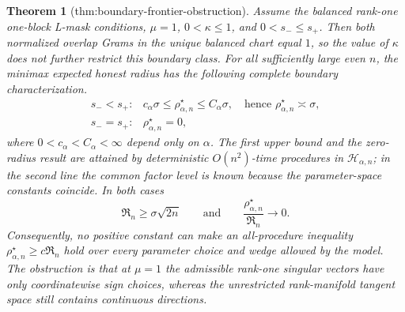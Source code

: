 \documentclass{article}
\newtheorem{theorem}{Theorem}
\begin{document}
\begin{theorem}[thm:boundary-frontier-obstruction]\label{thm:boundary-frontier-obstruction}
Assume the balanced rank-one one-block L-mask conditions, \(\mu=1\), \(0<\kappa\le 1\), and \(0<s_-\le s_+\).  Then both normalized overlap Grams in the unique balanced chart equal \(1\), so the value of \(\kappa\) does not further restrict this boundary class.  For all sufficiently large even \(n\), the minimax expected honest radius has the following complete boundary characterization.
\[
\begin{array}{ll}
s_-<s_+:& c_\alpha\sigma\le \rho_{\alpha,n}^{\star}\le C_\alpha\sigma,
\quad\text{hence }\rho_{\alpha,n}^{\star}\asymp\sigma,\\[3pt]
s_-=s_+:& \rho_{\alpha,n}^{\star}=0,
\end{array}
\]
where \(0<c_\alpha<C_\alpha<\infty\) depend only on \(\alpha\).  The first upper bound and the zero-radius result are attained by deterministic \(O(n^2)\)-time procedures in \(\mathcal H_{\alpha,n}\); in the second line the common factor level is known because the parameter-space constants coincide.  In both cases
\[
\mathfrak R_n\ge \sigma\sqrt{2n}
\qquad\text{and}\qquad
\frac{\rho_{\alpha,n}^{\star}}{\mathfrak R_n}\longrightarrow0.
\]
Consequently, no positive constant can make an all-procedure inequality \(\rho_{\alpha,n}^{\star}\ge c\mathfrak R_n\) hold over every parameter choice and wedge allowed by the model.  The obstruction is that at \(\mu=1\) the admissible rank-one singular vectors have only coordinatewise sign choices, whereas the unrestricted rank-manifold tangent space still contains continuous directions.
\end{theorem}
\end{document}
